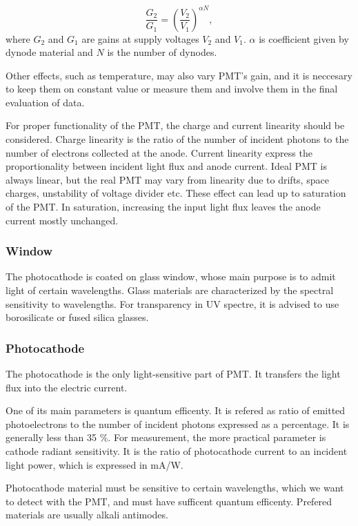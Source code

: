 \begin{equation}
\frac{G_2}{G_1} = (\frac{V_2}{V_1})^{\alpha N},
\label{gainVolt}
\end{equation}
where $G_2$ and $G_1$ are gains at supply voltages $V_2$ and $V_1$. $\alpha$ is coefficient given by dynode material and $N$ is the number of dynodes.
\par
Other effects, such as temperature, may also vary PMT's gain, and it is neccesary to keep them on constant value or measure them and involve them in the final evaluation of data.
\par
For proper functionality of the PMT, the charge and current linearity should be considered. Charge linearity is the ratio of the number of incident photons to the number of electrons collected at the anode. Current linearity express the proportionality between incident light flux and anode current. Ideal PMT is always linear, but the real PMT may vary from linearity due to drifts, space charges, unstability of voltage divider etc. These effect can lead up to saturation of the PMT. In saturation, increasing the input light flux leaves the anode current mostly unchanged.      


\subsubsection{Window}

The photocathode is coated on glass window, whose main purpose is to admit light of certain wavelengths. Glass materials are characterized by the spectral sensitivity to wavelengths. For transparency in UV spectre, it is advised to use borosilicate or fused silica glasses.


\subsubsection{Photocathode}

The photocathode is the only light-sensitive part of PMT. It transfers the light flux into the electric current.
\par
One of its main parameters is quantum efficenty. It is refered as ratio of emitted photoelectrons to the number of incident photons expressed as a percentage. It is generally less than 35 \%. For measurement, the more practical parameter is cathode radiant sensitivity. It is the ratio of photocathode current to an incident light power, which is expressed in mA/W.
\par
Photocathode material must be sensitive to certain wavelengths, which we want to detect with the PMT, and must have sufficent quantum efficenty. Prefered materials are usually alkali antimodes.
